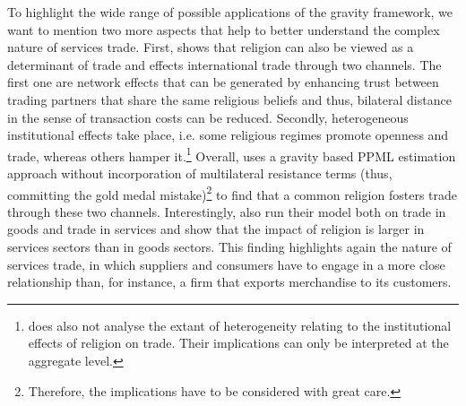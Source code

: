 To highlight the wide range of possible applications of the gravity framework, we want to mention two more aspects that help to better understand the complex nature of services trade. First, \textcite{religion} shows that religion can also be viewed as a determinant of trade and effects international trade through two channels. The first one are network effects that can be generated by enhancing trust between trading partners that share the same religious beliefs and thus, bilateral distance in the sense of transaction costs can be reduced. Secondly, heterogeneous institutional effects take place, i.e. some religious regimes promote openness and trade, whereas others hamper it.\footnote{\textcite{religion} does also not analyse the extant of heterogeneity relating to the institutional effects of religion on trade. Their implications can only be interpreted at the aggregate level.} Overall, \textcite{religion} uses a gravity based PPML estimation approach without incorporation of multilateral resistance terms (thus, committing the gold medal mistake)\footnote{Therefore, the implications have to be considered with great care.} to find that a common religion fosters trade through these two channels. Interestingly, \textcite{religion} also run their model both on trade in goods and trade in services and show that the impact of religion is larger in services sectors than in goods sectors. This finding highlights again the nature of services trade, in which suppliers and consumers have to engage in a more close relationship than, for instance, a firm that exports merchandise to its customers.  



